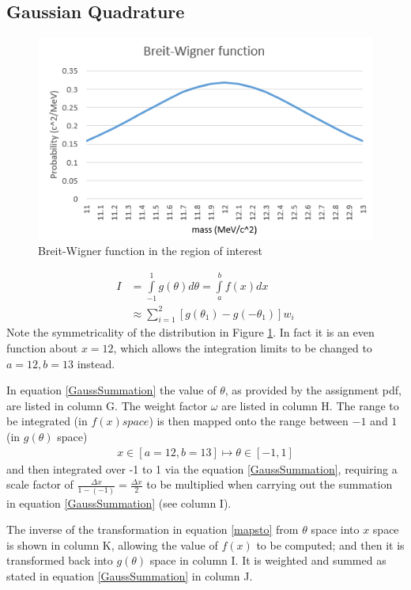 \documentclass[a4paper, 12pt]{article}
\begin{document}
\subsection{Gaussian Quadrature}

\begin{figure}[!h]
\centering
\includegraphics{3.PNG}
\caption{Breit-Wigner function in the region of interest}\label{3png}
\end{figure}

\begin{align}
  I&= \int\limits_{-1}^{1} g(\theta) d\theta  = \int\limits_{a}^{b} f(x) dx \\
   &\approx \sum \limits_{i=1}^{2} [g(\theta_1)-g(-\theta_1)] w_i \label{GaussSummation}
\end{align}
Note the symmetricality of the distribution in Figure \ref{3png}. In fact it is an even function about $x=12$, which allows the integration limits to be changed to $a=12,b=13$ instead.

In equation \ref{GaussSummation} the value of $\theta$, as provided by the assignment pdf, are listed in column G. The weight factor $\omega$ are listed in column H.
The range to be integrated (in $f(x) space$) is then mapped onto the range between $-1$ and $1$ (in $g(\theta)$ space)
\begin{align}
  x \in [a=12,b=13] \mapsto \theta \in [-1,1] \label{mapsto}
\end{align}
and then integrated over -1 to 1 via the equation \ref{GaussSummation}, requiring a scale factor of $\frac{\Delta x}{1-(-1)} = \frac{\Delta x}{2}$ to be multiplied when carrying out the summation in equation \ref{GaussSummation} (see column I).

The inverse of the transformation in equation \ref{mapsto} from $\theta$ space into $x$ space is shown in column K, allowing the value of $f(x)$ to be computed; and then it is transformed back into $g(\theta)$ space in column I. It is weighted and summed as stated in equation \ref{GaussSummation} in column J.
\end{document}
